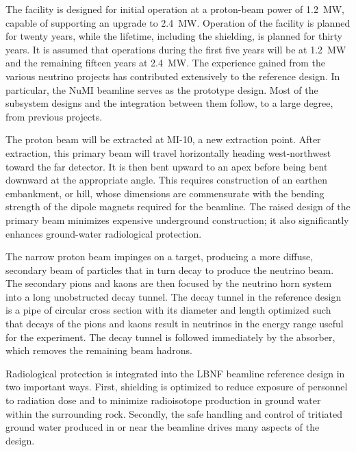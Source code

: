 The facility is designed for initial operation at a proton-beam power of \SI{1.2}{\MW}, capable of supporting an upgrade to \SI{2.4}{\MW}. Operation of the facility is planned for twenty years, while the lifetime, %
including the shielding, is planned for thirty years. It is 
assumed that operations during the first five years will be at \SI{1.2}{\MW} and the remaining fifteen years at \SI{2.4}{\MW}.  
The experience gained from the various neutrino projects has contributed extensively to the reference design. In particular, the NuMI beamline serves as the prototype design. Most of the subsystem designs and the integration between them follow, to a large degree, from previous projects. 
 
The proton beam will be extracted at MI-10, a new extraction point. After extraction, this primary beam will travel horizontally heading west-northwest toward 
the far detector. It is then 
bent upward to an apex before being bent downward at the appropriate angle. 
This requires construction of an earthen embankment, or hill, whose dimensions are commensurate with the bending strength of the dipole magnets required for the beamline. 
The raised design of the primary beam 
minimizes expensive underground construction; it also significantly enhances ground-water radiological protection. 

 
The narrow proton beam impinges on a target, producing a more diffuse, secondary beam of particles that in turn decay to produce the neutrino beam. 
The secondary pions and kaons are then focused by the neutrino horn system into a long unobstructed decay tunnel. 
The decay tunnel in the reference design is a pipe of circular cross section with its 
diameter and length optimized such that decays of the pions and kaons result in neutrinos in the energy range useful for the experiment. 
The decay tunnel is followed immediately by the absorber, which removes the remaining beam hadrons. 
 
Radiological protection is integrated into the LBNF beamline reference design in two important ways. First, shielding is optimized to reduce exposure of personnel to radiation dose and to minimize radioisotope production in ground water within the surrounding rock. Secondly, the safe handling and control of tritiated ground water produced in or near the beamline drives many aspects of the design. 
 
